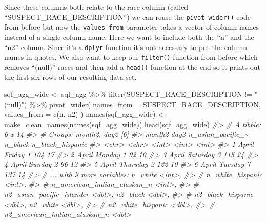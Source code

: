 \documentclass[
]{krantz}
\makeatletter
\newenvironment{Shaded}{\begin{snugshade}}{\end{snugshade}}
\newcommand{\AttributeTok}[1]{\textcolor[rgb]{0.61,0.61,0.61}{#1}}
\newcommand{\CommentTok}[1]{\textcolor[rgb]{0.37,0.37,0.37}{\textit{#1}}}
\newcommand{\FunctionTok}[1]{\textcolor[rgb]{0,0,0}{#1}}
\newcommand{\NormalTok}[1]{#1}
\newcommand{\OtherTok}[1]{\textcolor[rgb]{0.37,0.37,0.37}{#1}}
\newcommand{\SpecialCharTok}[1]{\textcolor[rgb]{0,0,0}{#1}}
\newcommand{\StringTok}[1]{\textcolor[rgb]{0.5,0.5,0.5}{#1}}
\newenvironment{kframe}{%
\medskip{}
\setlength{\fboxsep}{.8em}
 \def\at@end@of@kframe{}%
 \ifinner\ifhmode%
  \def\at@end@of@kframe{\end{minipage}}%
  \begin{minipage}{\columnwidth}%
 \fi\fi%
 \def\FrameCommand##1{\hskip\@totalleftmargin \hskip-\fboxsep
 \colorbox{shadecolor}{##1}\hskip-\fboxsep
     \hskip-\linewidth \hskip-\@totalleftmargin \hskip\columnwidth}%
 \MakeFramed {\advance\hsize-\width
   \@totalleftmargin\z@ \linewidth\hsize
   \@setminipage}}%
 {\par\unskip\endMakeFramed%
 \at@end@of@kframe}
\renewenvironment{Shaded}{\begin{kframe}}{\end{kframe}}
\makeatother
\begin{document}
Since these columns both relate to the race column (called
``SUSPECT\_RACE\_DESCRIPTION'') we can reuse the
\texttt{pivot\_wider()} code from before but now the
\texttt{values\_from} parameter takes a vector of column
names instead of a single column name. Here we want to
include both the ``n'' and the ``n2'' column. Since it's a
\texttt{dplyr} function it's not necessary to put the column
names in quotes. We also want to keep our \texttt{filter()}
function from before which removes ``(null)'' races and then
add a \texttt{head()} function at the end so it prints out
the first six rows of our resulting data set.

\begin{Shaded}
\begin{Highlighting}[]
\NormalTok{sqf\_agg\_wide }\OtherTok{\textless{}{-}}\NormalTok{ sqf\_agg }\SpecialCharTok{\%\textgreater{}\%}
  \FunctionTok{filter}\NormalTok{(SUSPECT\_RACE\_DESCRIPTION }\SpecialCharTok{!=} \StringTok{"(null)"}\NormalTok{) }\SpecialCharTok{\%\textgreater{}\%}
  \FunctionTok{pivot\_wider}\NormalTok{(}
    \AttributeTok{names\_from =}\NormalTok{ SUSPECT\_RACE\_DESCRIPTION,}
    \AttributeTok{values\_from =} \FunctionTok{c}\NormalTok{(n, n2)}
\NormalTok{  )}
\FunctionTok{names}\NormalTok{(sqf\_agg\_wide) }\OtherTok{\textless{}{-}} \FunctionTok{make\_clean\_names}\NormalTok{(}\FunctionTok{names}\NormalTok{(sqf\_agg\_wide))}
\FunctionTok{head}\NormalTok{(sqf\_agg\_wide)}
\CommentTok{\#\textgreater{} \# A tibble: 6 x 14}
\CommentTok{\#\textgreater{} \# Groups:   month2, day2 [6]}
\CommentTok{\#\textgreater{}   month2 day2     n\_asian\_pacific\_\textasciitilde{} n\_black n\_black\_hispanic}
\CommentTok{\#\textgreater{}   \textless{}chr\textgreater{}  \textless{}chr\textgreater{}                \textless{}int\textgreater{}   \textless{}int\textgreater{}            \textless{}int\textgreater{}}
\CommentTok{\#\textgreater{} 1 April  Friday                   1     104               17}
\CommentTok{\#\textgreater{} 2 April  Monday                   1      92               10}
\CommentTok{\#\textgreater{} 3 April  Saturday                 3     115               24}
\CommentTok{\#\textgreater{} 4 April  Sunday                   2      96               12}
\CommentTok{\#\textgreater{} 5 April  Thursday                 2     122               10}
\CommentTok{\#\textgreater{} 6 April  Tuesday                  7     137               14}
\CommentTok{\#\textgreater{} \# ... with 9 more variables: n\_white \textless{}int\textgreater{},}
\CommentTok{\#\textgreater{} \#   n\_white\_hispanic \textless{}int\textgreater{},}
\CommentTok{\#\textgreater{} \#   n\_american\_indian\_alaskan\_n \textless{}int\textgreater{},}
\CommentTok{\#\textgreater{} \#   n2\_asian\_pacific\_islander \textless{}dbl\textgreater{}, n2\_black \textless{}dbl\textgreater{},}
\CommentTok{\#\textgreater{} \#   n2\_black\_hispanic \textless{}dbl\textgreater{}, n2\_white \textless{}dbl\textgreater{},}
\CommentTok{\#\textgreater{} \#   n2\_white\_hispanic \textless{}dbl\textgreater{},}
\CommentTok{\#\textgreater{} \#   n2\_american\_indian\_alaskan\_n \textless{}dbl\textgreater{}}
\end{Highlighting}
\end{Shaded}
\end{document}
